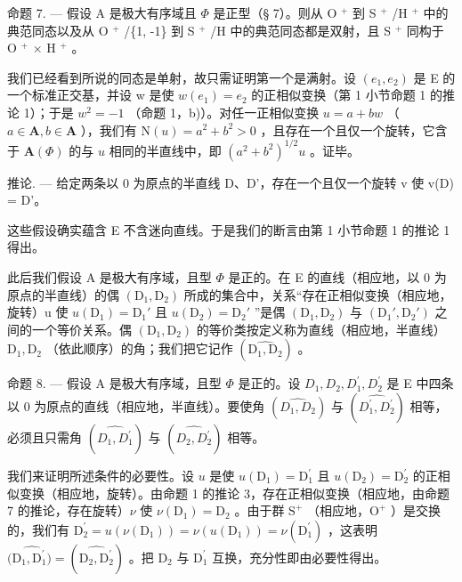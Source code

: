 命题 7. --- 假设 A 是极大有序域且 \(\Phi\) 是正型（§ 7）。则从 O \(^{+}\) 到 S \(^{+}\) /H \(^{+}\) 中的典范同态以及从 O \(^{+}\) /\{1, -1\} 到 S \(^{+}\) /H 中的典范同态都是双射，且 S \(^{+}\) 同构于 O \(^{+}\) × H \(^{+}\) 。

我们已经看到所说的同态是单射，故只需证明第一个是满射。设 \((e_{1}, e_{2})\) 是 E 的一个标准正交基，并设 w 是使 \(w(e_{1}) = e_{2}\) 的正相似变换（第 1 小节命题 1 的推论 1）；于是 \(w^{2} = -1\) （命题 1，b)）。对任一正相似变换 \(u = a + bw\) （ \(a \in \mathbf{A}, b \in \mathbf{A}\) ），我们有 \(\mathrm{N}(u) = a^2 + b^2 > 0\) ，且存在一个且仅一个旋转，它含于 \(\mathbf{A}(\Phi)\) 的与 \(u\) 相同的半直线中，即 \((a^2 + b^2)^{1/2} u\) 。证毕。

推论. --- 给定两条以 0 为原点的半直线 D、D'，存在一个且仅一个旋转 v 使 v(D) = D'。

这些假设确实蕴含 E 不含迷向直线。于是我们的断言由第 1 小节命题 1 的推论 1 得出。

此后我们假设 A 是极大有序域，且型 \(\Phi\) 是正的。在 E 的直线（相应地，以 0 为原点的半直线）的偶 \((\mathrm{D}_1, \mathrm{D}_2)\) 所成的集合中，关系“存在正相似变换（相应地，旋转）u 使 \(u(\mathrm{D}_1) = \mathrm{D}_1'\) 且 \(u(\mathrm{D}_2) = \mathrm{D}_2'\) ”是偶 \((\mathrm{D}_1, \mathrm{D}_2)\) 与 \((\mathrm{D}_1', \mathrm{D}_2')\) 之间的一个等价关系。偶 \((\mathrm{D}_1, \mathrm{D}_2)\) 的等价类按定义称为直线（相应地，半直线）\(\mathrm{D}_1, \mathrm{D}_2\) （依此顺序）的角；我们把它记作 \((\widehat{\mathrm{D}_1, \mathrm{D}_2})\) 。

命题 8. --- 假设 A 是极大有序域，且型 \(\Phi\) 是正的。设 \(D_{1}, D_{2}, D_{1}^{\prime}, D_{2}^{\prime}\) 是 E 中四条以 0 为原点的直线（相应地，半直线）。要使角 \((\widehat{D_{1}, D_{2}})\) 与 \((\widehat{D_{1}^{\prime}, D_{2}^{\prime}})\) 相等，必须且只需角 \((\widehat{D_{1}, D_{1}^{\prime}})\) 与 \((\widehat{D_{2}, D_{2}^{\prime}})\) 相等。

我们来证明所述条件的必要性。设 \(u\) 是使 \(u(\mathrm{D}_{1}) = \mathrm{D}_{1}^{\prime}\) 且 \(u(\mathrm{D}_{2}) = \mathrm{D}_{2}^{\prime}\) 的正相似变换（相应地，旋转）。由命题 1 的推论 3，存在正相似变换（相应地，由命题 7 的推论，存在旋转）\(\nu\) 使 \(\nu(\mathrm{D}_{1}) = \mathrm{D}_{2}\) 。由于群 \(\mathrm{S}^{+}\) （相应地，\(\mathrm{O}^{+}\) ）是交换的，我们有 \(\mathrm{D}_{2}^{\prime} = u(\nu(\mathrm{D}_{1})) = \nu(u(\mathrm{D}_{1})) = \nu(\mathrm{D}_{1}^{\prime})\) ，这表明 \((\widehat{\mathrm{D}_{1}, \mathrm{D}_{1}^{\prime})} = (\widehat{\mathrm{D}_{2}, \mathrm{D}_{2}^{\prime}})\) 。把 \(\mathrm{D}_{2}\) 与 \(\mathrm{D}_{1}^{\prime}\) 互换，充分性即由必要性得出。

